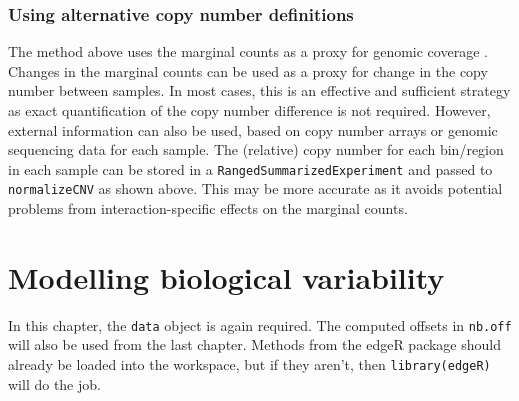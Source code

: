 \documentclass[12pt]{report}
\newcommand{\edgeR}{edgeR}
\newcommand{\code}[1]{{\small\texttt{#1}}}
\newenvironment{combox}
{ \begin{shaded}\begin{center}\begin{minipage}[t]{0.95\textwidth} }
{ \end{minipage}\end{center}\end{shaded} }
\begin{document}
% 
% 

\subsection{Using alternative copy number definitions}
The method above uses the marginal counts as a proxy for genomic coverage \cite{imakaev2012iterative}.
Changes in the marginal counts can be used as a proxy for change in the copy number between samples.     
In most cases, this is an effective and sufficient strategy as exact quantification of the copy number difference is not required.
However, external information can also be used, based on copy number arrays or genomic sequencing data for each sample.
The (relative) copy number for each bin/region in each sample can be stored in a \code{RangedSummarizedExperiment} and passed to \code{normalizeCNV} as shown above.
This may be more accurate as it avoids potential problems from interaction-specific effects on the marginal counts.

\chapter{Modelling biological variability}

\begin{combox}
In this chapter, the \code{data} object is again required.
The computed offsets in \code{nb.off} will also be used from the last chapter.
Methods from the \edgeR{} package should already be loaded into the workspace, but if they aren't, then \code{library(edgeR)} will do the job.
\end{combox}
\end{document}
